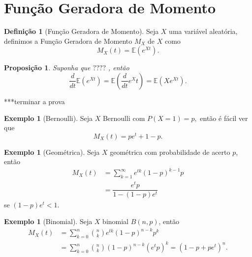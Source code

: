 \documentclass[12pt,a4paper,oneside]{book}
\newtheorem{proposition}[theorem]{Proposi\c{c}\~ao}
\theoremstyle{definition}
\newtheorem{definition}[theorem]{Defini\c{c}\~ao}
\newtheorem{example}[theorem]{Exemplo}
\theoremstyle{remark}
\numberwithin{equation}{section}
\newcommand{\E}{\mathbb{E}}
\begin{document}
\newpage
\section{Função Geradora de Momento}\label{sec-geradora-momento}


\begin{definition}[Função Geradora de Momento]
Seja $X$ uma variável aleatória, definimos a Função Geradora de Momento $M_X$ de $X$ como
$$M_X(t) = \E(e^{Xt}). $$
\end{definition}


\begin{proposition}
Suponha que $????$ , então
$$\dfrac{d }{dt}\E(e^{Xt}) =\E\left(\dfrac{d}{dt}e^Xt\right) =  \E(Xe^{Xt}). $$
\end{proposition}
***terminar a prova

\begin{example}[Bernoulli]
Seja $X$ Bernoulli com $P(X=1) = p,$ então é fácil ver que
$$M_X(t) = pe^t + 1 - p. $$
\end{example}

\begin{example}[Geométrica]
Seja $X$ geométrica com probabilidade de acerto $p$, então 
\begin{align*}
M_X(t)  &= \sum_{k=1}^\infty e^{tk}(1-p)^{k-1}p\\
		&= \dfrac{e^t p }{1-(1-p)e^t}
\end{align*}
se $(1-p)e^t<1.$
\end{example}

\begin{example}[Binomial] Seja $X$ binomial $B(n,p)$, então
\begin{align*}
M_X(t)  &= \sum_{k=0}^n {n\choose k} e^{tk}(1-p)^{n-k}p^k\\
		&= \sum_{k=0}^n {n\choose k} (1-p)^{n-k}(e^tp)^k = (1-p+  pe^t )^n.
\end{align*}
\end{example}
\end{document}
